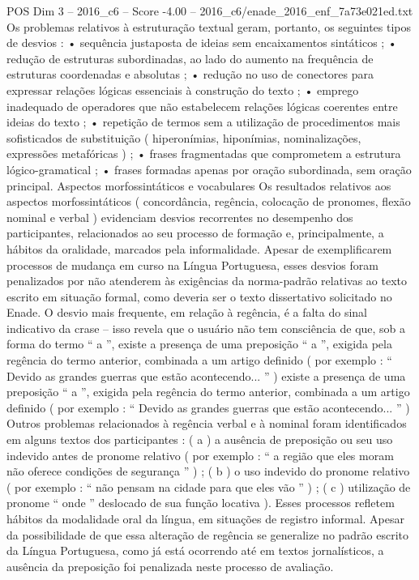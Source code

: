 \begin{textsample}{POS Dim 3 – 2016\_c6 – Score -4.00 – 2016\_c6/enade\_2016\_enf\_7a73e021ed.txt}
Os problemas relativos à estruturação textual geram, portanto, os seguintes tipos de desvios : • sequência justaposta de ideias sem encaixamentos sintáticos ; • redução de estruturas subordinadas, ao lado do aumento na frequência de estruturas coordenadas e absolutas ; • redução no uso de conectores para expressar relações lógicas essenciais à construção do texto ; • emprego inadequado de operadores que não estabelecem relações lógicas coerentes entre ideias do texto ; • repetição de termos sem a utilização de procedimentos mais sofisticados de substituição ( hiperonímias, hiponímias, nominalizações, expressões metafóricas ) ; • frases fragmentadas que comprometem a estrutura lógico-gramatical ; • frases formadas apenas por oração subordinada, sem oração principal.
Aspectos morfossintáticos e vocabulares Os resultados relativos aos aspectos morfossintáticos ( concordância, regência, colocação de pronomes, flexão nominal e verbal ) evidenciam desvios recorrentes no desempenho dos participantes, relacionados ao seu processo de formação e, principalmente, a hábitos da oralidade, marcados pela informalidade.
Apesar de exemplificarem processos de mudança em curso na Língua Portuguesa, esses desvios foram penalizados por não atenderem às exigências da norma-padrão relativas ao texto escrito em situação formal, como deveria ser o texto dissertativo solicitado no Enade.
O desvio mais frequente, em relação à regência, é a falta do sinal indicativo da crase – isso revela que o usuário não tem consciência de que, sob a forma do termo “ a ”, existe a presença de uma preposição “ a ”, exigida pela regência do termo anterior, combinada a um artigo definido ( por exemplo : “ Devido as grandes guerras que estão acontecendo... ” ) existe a presença de uma preposição “ a ”, exigida pela regência do termo anterior, combinada a um artigo definido ( por exemplo : “ Devido as grandes guerras que estão acontecendo... ” ) Outros problemas relacionados à regência verbal e à nominal foram identificados em alguns textos dos participantes : ( a ) a ausência de preposição ou seu uso indevido antes de pronome relativo ( por exemplo : “ a região que eles moram não oferece condições de segurança ” ) ; ( b ) o uso indevido do pronome relativo ( por exemplo : “ não pensam na cidade para que eles vão ” ) ; ( c ) utilização de pronome “ onde ” deslocado de sua função locativa ).
Esses processos refletem hábitos da modalidade oral da língua, em situações de registro informal.
Apesar da possibilidade de que essa alteração de regência se generalize no padrão escrito da Língua Portuguesa, como já está ocorrendo até em textos jornalísticos, a ausência da preposição foi penalizada neste processo de avaliação.

\end{textsample}
